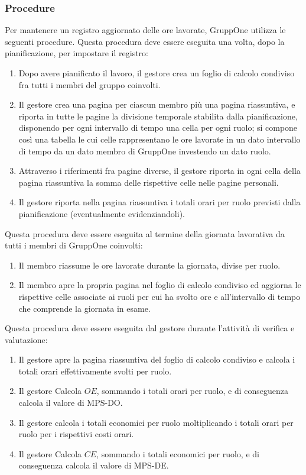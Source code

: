 \documentclass[../../norme-di-progetto.tex]{subfiles}
\begin{document}
\subsubsection{Procedure}%
\label{subs:gestione-di-processo/procedure}

Per mantenere un registro aggiornato delle ore lavorate, GruppOne utilizza le seguenti procedure.
Questa procedura deve essere eseguita una volta, dopo la pianificazione, per impostare il registro:

\begin{enumerate}
  \item Dopo avere pianificato il lavoro, il gestore crea un foglio di calcolo condiviso fra tutti i membri del gruppo coinvolti.
  \item Il gestore crea una pagina per ciascun membro più una pagina riassuntiva, e riporta in tutte le pagine la divisione temporale stabilita dalla pianificazione, disponendo per ogni intervallo di tempo una cella per ogni ruolo; si compone così una tabella le cui celle rappresentano le ore lavorate in un dato intervallo di tempo da un dato membro di GruppOne investendo un dato ruolo.
  \item Attraverso i riferimenti fra pagine diverse, il gestore riporta in ogni cella della pagina riassuntiva la somma delle rispettive celle nelle pagine personali.
  \item Il gestore riporta nella pagina riassuntiva i totali orari per ruolo previsti dalla pianificazione (eventualmente evidenziandoli).
\end{enumerate}

Questa procedura deve essere eseguita al termine della giornata lavorativa da tutti i membri di GruppOne coinvolti:

\begin{enumerate}
  \item Il membro riassume le ore lavorate durante la giornata, divise per ruolo.
  \item Il membro apre la propria pagina nel foglio di calcolo condiviso ed aggiorna le rispettive celle associate ai ruoli per cui ha svolto ore e all'intervallo di tempo che comprende la giornata in esame.
\end{enumerate}

Questa procedura deve essere eseguita dal gestore durante l'attività di verifica e valutazione:

\begin{enumerate}
  \item Il gestore apre la pagina riassuntiva del foglio di calcolo condiviso e calcola i totali orari effettivamente svolti per ruolo.
  \item Il gestore Calcola \(OE\), sommando i totali orari per ruolo, e di conseguenza calcola il valore di MPS-DO\@.
  \item Il gestore calcola i totali economici per ruolo moltiplicando i totali orari per ruolo per i rispettivi costi orari.
  \item Il gestore Calcola \(CE\), sommando i totali economici per ruolo, e di conseguenza calcola il valore di MPS-DE\@.
\end{enumerate}
\end{document}
